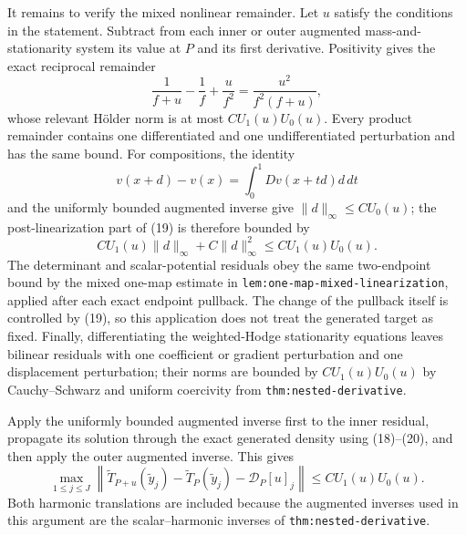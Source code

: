 It remains to verify the mixed nonlinear remainder.  Let \(u\) satisfy the conditions in the statement.  Subtract from each inner or outer augmented mass-and-stationarity system its value at \(P\) and its first derivative.  Positivity gives the exact reciprocal remainder
\[
 \frac1{f+u}-\frac1f+\frac{u}{f^2}
 =\frac{u^2}{f^2(f+u)},
\tag{18}
\]
whose relevant H\"older norm is at most \(CU_1(u)U_0(u)\).  Every product remainder contains one differentiated and one undifferentiated perturbation and has the same bound.  For compositions, the identity
\[
 v(x+d)-v(x)=\int_0^1Dv(x+td)d\,dt
\tag{19}
\]
and the uniformly bounded augmented inverse give
\(\lVert d\rVert_\infty\leq CU_0(u)\); the post-linearization part of (19) is therefore bounded by
\[
 CU_1(u)\lVert d\rVert_\infty+C\lVert d\rVert_\infty^2
 \leq CU_1(u)U_0(u).
\tag{20}
\]
The determinant and scalar-potential residuals obey the same two-endpoint bound by the mixed one-map estimate in
\texttt{lem:one-map-mixed-linearization}, applied after each exact endpoint pullback.  The change of the pullback itself is controlled by (19), so this application does not treat the generated target as fixed.  Finally, differentiating the weighted-Hodge stationarity equations leaves bilinear residuals with one coefficient or gradient perturbation and one displacement perturbation; their norms are bounded by \(CU_1(u)U_0(u)\) by Cauchy--Schwarz and uniform coercivity from
\texttt{thm:nested-derivative}.

Apply the uniformly bounded augmented inverse first to the inner residual, propagate its solution through the exact generated density using (18)--(20), and then apply the outer augmented inverse.  This gives
\[
 \max_{1\leq j\leq J}
 \left\lVert
 \widetilde T_{P+u}(\widetilde y_j)-\widetilde T_P(\widetilde y_j)
 -\mathcal D_P[u]_j
 \right\rVert
 \leq CU_1(u)U_0(u).
\tag{21}
\]
Both harmonic translations are included because the augmented inverses used in this argument are the scalar--harmonic inverses of
\texttt{thm:nested-derivative}.

